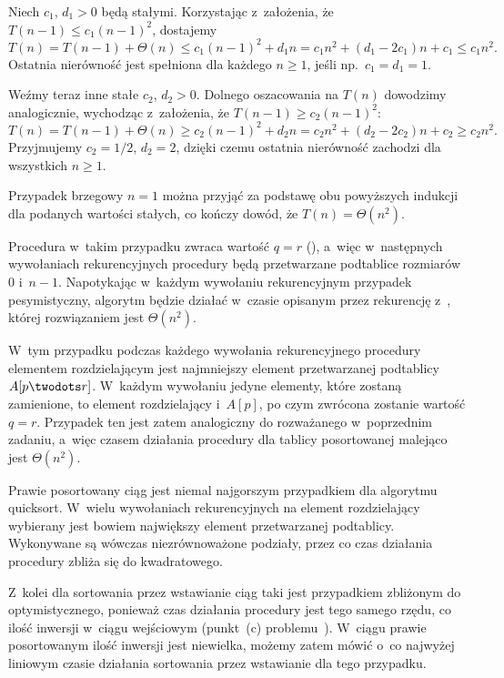 \exercise %
Niech $c_1$, $d_1>0$ będą stałymi. Korzystając z~założenia, że $T(n-1)\le c_1(n-1)^2$, dostajemy
\[
	T(n) = T(n-1)+\Theta(n) \le c_1(n-1)^2+d_1n = c_1n^2+(d_1-2c_1)n+c_1 \le c_1n^2.
\]
Ostatnia nierówność jest spełniona dla każdego $n\ge1$, jeśli np.\ $c_1=d_1=1$.

Weźmy teraz inne stałe $c_2$, $d_2>0$. Dolnego oszacowania na $T(n)$ dowodzimy analogicznie, wychodząc z~założenia, że $T(n-1)\ge c_2(n-1)^2$:
\[
	T(n) = T(n-1)+\Theta(n) \ge c_2(n-1)^2+d_2n = c_2n^2+(d_2-2c_2)n+c_2 \ge c_2n^2.
\]
Przyjmujemy $c_2=1/2$, $d_2=2$, dzięki czemu ostatnia nierówność zachodzi dla wszystkich $n\ge1$.

Przypadek brzegowy $n=1$ można przyjąć za podstawę obu powyższych indukcji dla podanych wartości stałych, co kończy dowód, że $T(n)=\Theta(n^2)$.

\exercise %
Procedura  w~takim przypadku zwraca wartość $q=r$ (), a~więc w~następnych wywołaniach rekurencyjnych procedury  będą przetwarzane podtablice rozmiarów 0 i~$n-1$. Napotykając w~każdym wywołaniu rekurencyjnym przypadek pesymistyczny, algorytm będzie działać w~czasie opisanym przez rekurencję z~, której rozwiązaniem jest $\Theta(n^2)$.

\exercise %
W~tym przypadku podczas każdego wywołania rekurencyjnego procedury  elementem rozdzielającym jest najmniejszy element przetwarzanej podtablicy $A[p\twodots r]$. W~każdym wywołaniu jedyne elementy, które zostaną zamienione, to element rozdzielający i~$A[p]$, po czym zwrócona zostanie wartość $q=r$. Przypadek ten jest zatem analogiczny do rozważanego w~poprzednim zadaniu, a~więc czasem działania procedury  dla tablicy posortowanej malejąco jest $\Theta(n^2)$.

\exercise %
Prawie posortowany ciąg jest niemal najgorszym przypadkiem dla algorytmu quicksort. W~wielu wywołaniach rekurencyjnych na element rozdzielający wybierany jest bowiem największy element przetwarzanej podtablicy. Wykonywane są wówczas niezrównoważone podziały, przez co czas działania procedury  zbliża się do kwadratowego.

Z~kolei dla sortowania przez wstawianie ciąg taki jest przypadkiem zbliżonym do optymistycznego, ponieważ czas działania procedury  jest tego samego rzędu, co ilość inwersji w~ciągu wejściowym (punkt~(c) problemu~). W~ciągu prawie posortowanym ilość inwersji jest niewielka, możemy zatem mówić o~co najwyżej liniowym czasie działania sortowania przez wstawianie dla tego przypadku.

